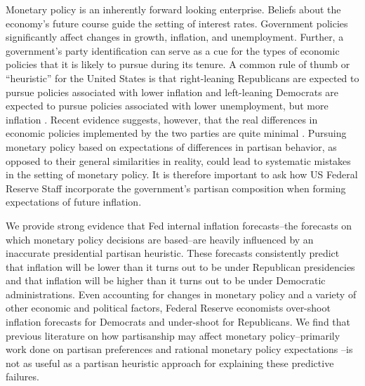 \documentclass[a4paper]{article}\usepackage{graphicx, color}
\begin{document}
Monetary policy is an inherently forward looking enterprise. Beliefs about the economy's future course guide the setting of interest rates. Government policies significantly affect changes in growth, inflation, and unemployment. Further, a government's party identification can serve as a cue for the types of economic policies that it is likely to pursue during its tenure. A common rule of thumb or ``heuristic'' for the United States is that right-leaning Republicans are expected to pursue policies associated with lower inflation and left-leaning Democrats are expected to pursue policies associated with lower unemployment, but more inflation \cite[see][]{Samuelson1977,HibbsJr1977}. Recent evidence suggests, however, that the real differences in economic policies implemented by the two parties are quite minimal \citep{Bartels2008}. Pursuing monetary policy based on expectations of differences in partisan behavior, as opposed to their general similarities in reality, could lead to systematic mistakes in the setting of monetary policy. It is therefore important to ask how US Federal Reserve Staff incorporate the government's partisan composition when forming expectations of future inflation.

We provide strong evidence that Fed internal inflation forecasts--the forecasts on which monetary policy decisions are based--are heavily influenced by an inaccurate presidential partisan heuristic. These forecasts consistently predict that inflation will be lower than it turns out to be under Republican presidencies and that inflation will be higher than it turns out to be under Democratic administrations. Even accounting for changes in monetary policy and a variety of other economic and political factors, Federal Reserve economists over-shoot inflation forecasts for Democrats and under-shoot for Republicans. We find that previous literature on how partisanship may affect monetary policy--primarily work done on partisan preferences \citep{Clark2012,Hakes1988,Sieg1997,Tootell1996} and rational monetary policy expectations \citep{Alesina1991,Hibbs1994}--is not as useful as a partisan heuristic approach for explaining these predictive failures.
\end{document}
